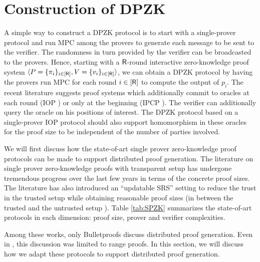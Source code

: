 \section{Construction of DPZK}
A simple way to construct a DPZK protocol is to start with a single-prover protocol and run MPC among the provers to generate each message to be sent to the verifier. The randomness in turn provided by the verifier can be broadcasted to the provers.
Hence, starting with a $\mathsf{R}$-round interactive zero-knowledge proof system $\langle P = \{\pi_i\}_{i\in[\mathsf{R}]},V = \{v_i\}_{i \in [\mathsf{R}]}\rangle$, we can obtain a DPZK protocol by having the provers run MPC for each round $i \in [\mathsf{R}]$ to compute the output of $p_i$. The recent literature suggests proof systems which additionally commit to oracles at each round (IOP \cite{aurora}) or only at the beginning (IPCP \cite{ligero}). The verifier can additionally query the oracle on his positions of interest. The DPZK protocol based on a single-prover IOP protocol should also support homomorphism in these oracles for the proof size to be independent of the number of parties involved.





We will first discuss how the state-of-art single prover zero-knowledge proof protocols can be made to support distributed proof generation.
The literature on single prover zero-knowledge proofs with transparent setup has undergone tremendous progress over the last few years in terms of the concrete proof sizes. The literature has also introduced an ``updatable SRS'' setting \cite{sonic, libra, supersonic} to reduce the trust in the trusted setup while obtaining reasonable proof sizes (in between the trusted \cite{pinnochio_PHGR} and the untrusted setup \cite{aurora, bulletproofs}). Table \ref{tab:SPZK} summarizes the state-of-art protocols in each dimension: proof size, prover and verifier complexities.

Among these works, only Bulletproofs \cite{bulletproofs} discuss distributed proof generation. Even in \cite{bulletproofs}, this discussion was limited to range proofs. In this section, we will discuss how we adapt these protocols to support distributed proof generation. %

